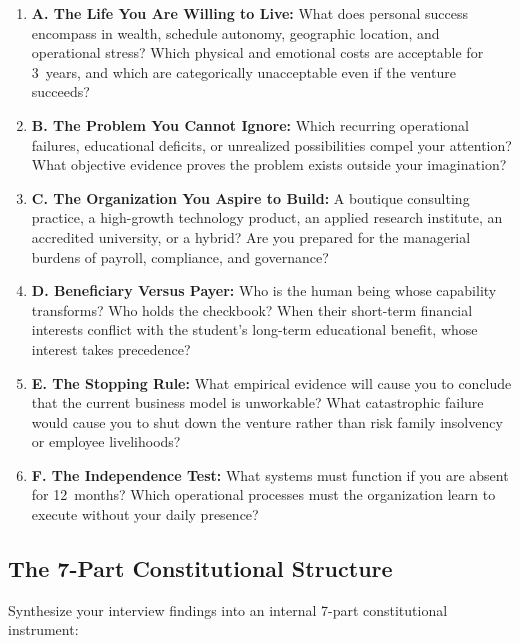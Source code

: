\begin{enumerate}[leftmargin=12pt,itemsep=3pt,topsep=1pt,parsep=0pt]
  \item \textbf{A. The Life You Are Willing to Live:} What does personal success encompass in wealth, schedule autonomy, geographic location, and operational stress? Which physical and emotional costs are acceptable for 3~years, and which are categorically unacceptable even if the venture succeeds?
  \item \textbf{B. The Problem You Cannot Ignore:} Which recurring operational failures, educational deficits, or unrealized possibilities compel your attention? What objective evidence proves the problem exists outside your imagination?
  \item \textbf{C. The Organization You Aspire to Build:} A boutique consulting practice, a high-growth technology product, an applied research institute, an accredited university, or a hybrid? Are you prepared for the managerial burdens of payroll, compliance, and governance?
  \item \textbf{D. Beneficiary Versus Payer:} Who is the human being whose capability transforms? Who holds the checkbook? When their short-term financial interests conflict with the student's long-term educational benefit, whose interest takes precedence?
  \item \textbf{E. The Stopping Rule:} What empirical evidence will cause you to conclude that the current business model is unworkable? What catastrophic failure would cause you to shut down the venture rather than risk family insolvency or employee livelihoods?
  \item \textbf{F. The Independence Test:} What systems must function if you are absent for 12~months? Which operational processes must the organization learn to execute without your daily presence?
\end{enumerate}

\subsection{The 7-Part Constitutional Structure}

Synthesize your interview findings into an internal 7-part constitutional instrument:

